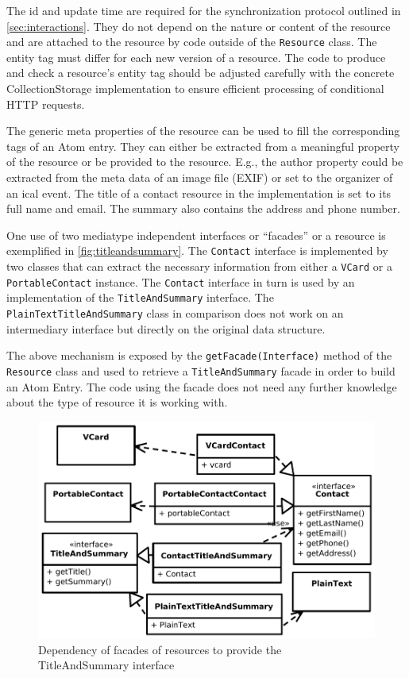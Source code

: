 \documentclass[11pt,a4paper,headsepline,twoside]{scrartcl}		%
\begin{document}
The id and update time are required for the synchronization protocol outlined in
\autoref{sec:interactions}. They do not depend on the nature or content of the
resource and are attached to the resource by code outside of the
\lstinline:Resource: class. The entity tag must differ for each new version of a
resource. The code to produce and check a resource's entity tag should be
adjusted carefully with the concrete CollectionStorage implementation to ensure
efficient processing of conditional HTTP requests.

The generic meta properties of the resource can be used to fill the
corresponding tags of an Atom entry. They can either be extracted from a
meaningful property of the resource or be provided to the resource. E.g., the
author property could be extracted from the meta data of an image file (EXIF) or
set to the organizer of an ical event. The title of a contact resource in the
implementation is set to its full name and email. The summary also contains the
address and phone number.

One use of two mediatype independent interfaces or ``facades'' or a resource is
exemplified in \autoref{fig:titleandsummary}. The \lstinline:Contact: interface
is implemented by two classes that can extract the necessary information from
either a \lstinline:VCard: or a \lstinline:PortableContact: instance. The
\lstinline:Contact: interface in turn is used by an implementation of the
\lstinline:TitleAndSummary: interface. The \lstinline:PlainTextTitleAndSummary:
class in comparison does not work on an intermediary interface but directly on
the original data structure.

The above mechanism is exposed by the \lstinline:getFacade(Interface): method of
the \lstinline:Resource: class and used to retrieve a
\lstinline:TitleAndSummary: facade in order to build an Atom Entry. The code
using the facade does not need any further knowledge about the type of resource
it is working with.

\begin{figure}[htb]
  \centering
  \includegraphics[width=1\textwidth]{titleandsummary}

  \caption{Dependency of facades of resources to provide the TitleAndSummary interface}
  \label{fig:titleandsummary}
\end{figure}
\end{document}
